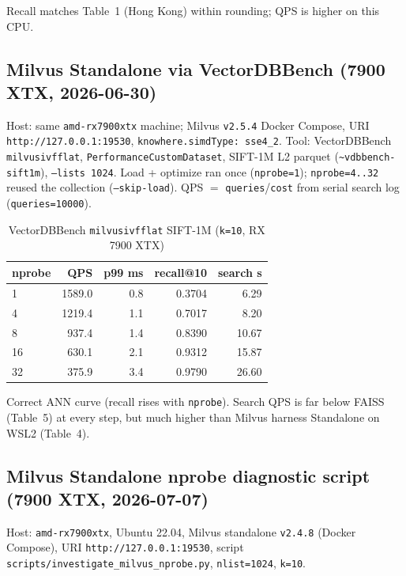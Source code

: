 \documentclass[11pt,a4paper]{article}
\begin{document}
Recall matches Table~1 (Hong Kong) within rounding; QPS is higher on this CPU.

\subsection{Milvus Standalone via VectorDBBench (7900 XTX, 2026-06-30)}

Host: same \texttt{amd-rx7900xtx} machine; Milvus \texttt{v2.5.4} Docker Compose,
URI \texttt{http://127.0.0.1:19530}, \texttt{knowhere.simdType: sse4\_2}.
Tool: VectorDBBench \texttt{milvusivfflat}, \texttt{PerformanceCustomDataset},
SIFT-1M L2 parquet (\texttt{\textasciitilde{}vdbbench-sift1m}), \texttt{--lists 1024}.
Load + optimize ran once (\texttt{nprobe=1}); \texttt{nprobe=4..32} reused the collection
(\texttt{--skip-load}). QPS $=$ \texttt{queries}/\texttt{cost} from serial search log
(\texttt{queries=10000}).

\begin{table}[h]
\centering
\caption{VectorDBBench \texttt{milvusivfflat} SIFT-1M (\texttt{k=10}, RX 7900 XTX)}
\begin{tabular}{@{}lrrrr@{}}
\toprule
\textbf{nprobe} & \textbf{QPS} & \textbf{p99 ms} & \textbf{recall@10} & \textbf{search s} \\
\midrule
1  & 1589.0 &  0.8 & 0.3704 &  6.29 \\
4  & 1219.4 &  1.1 & 0.7017 &  8.20 \\
8  &  937.4 &  1.4 & 0.8390 & 10.67 \\
16 &  630.1 &  2.1 & 0.9312 & 15.87 \\
32 &  375.9 &  3.4 & 0.9790 & 26.60 \\
\bottomrule
\end{tabular}
\end{table}

Correct ANN curve (recall rises with \texttt{nprobe}). Search QPS is far below FAISS
(Table~5) at every step, but much higher than Milvus harness Standalone on WSL2 (Table~4).

\subsection{Milvus Standalone nprobe diagnostic script (7900 XTX, 2026-07-07)}

Host: \texttt{amd-rx7900xtx}, Ubuntu 22.04, Milvus standalone \texttt{v2.4.8} (Docker
Compose), URI \texttt{http://127.0.0.1:19530}, script
\texttt{scripts/investigate\_milvus\_nprobe.py}, \texttt{nlist=1024}, \texttt{k=10}.
\end{document}
